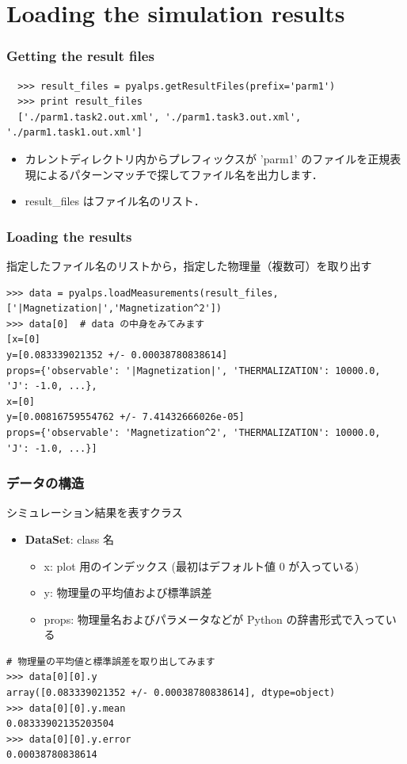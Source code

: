 \section{Loading the simulation results}
\begin{frame}[t,fragile]
 \frametitle{Getting the result files}
 \begin{lstlisting}
  >>> result_files = pyalps.getResultFiles(prefix='parm1')
  >>> print result_files
  ['./parm1.task2.out.xml', './parm1.task3.out.xml', './parm1.task1.out.xml']
 \end{lstlisting}
 \begin{itemize}
  \item カレントディレクトリ内からプレフィックスが 'parm1' のファイルを正規表現によるパターンマッチで探してファイル名を出力します．
  \item result\_files はファイル名のリスト．
 \end{itemize}
\end{frame}

\begin{frame}[t,fragile]
\frametitle{Loading the results}
指定したファイル名のリストから，指定した物理量（複数可）を取り出す
\begin{lstlisting}
>>> data = pyalps.loadMeasurements(result_files,['|Magnetization|','Magnetization^2'])
>>> data[0]  # data の中身をみてみます
[x=[0]
y=[0.083339021352 +/- 0.00038780838614]
props={'observable': '|Magnetization|', 'THERMALIZATION': 10000.0, 'J': -1.0, ...}, 
x=[0]
y=[0.00816759554762 +/- 7.41432666026e-05]
props={'observable': 'Magnetization^2', 'THERMALIZATION': 10000.0, 'J': -1.0, ...}]
\end{lstlisting}
\end{frame}

\begin{frame}[t,fragile]
\frametitle{データの構造}
シミュレーション結果を表すクラス
\begin{itemize}
\item \textbf{DataSet}: class 名
  \begin{itemize}
  \item x: plot 用のインデックス (最初はデフォルト値 0 が入っている)
  \item y: 物理量の平均値および標準誤差
  \item props: 物理量名およびパラメータなどが Python の辞書形式で入っている
  \end{itemize}
\end{itemize}

\begin{lstlisting}
# 物理量の平均値と標準誤差を取り出してみます
>>> data[0][0].y
array([0.083339021352 +/- 0.00038780838614], dtype=object)
>>> data[0][0].y.mean
0.08333902135203504
>>> data[0][0].y.error
0.00038780838614
\end{lstlisting}
\end{frame}

